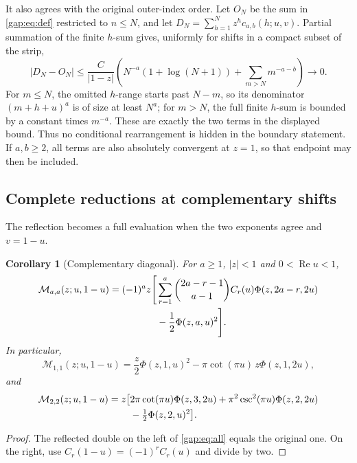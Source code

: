 \documentclass[11pt,letterpaper]{article}
\numberwithin{equation}{section}
\theoremstyle{plain}
\newtheorem{corollary}[theorem]{Corollary}
\theoremstyle{definition}
\theoremstyle{remark}
\begin{document}
It also agrees with the original outer-index order. Let $O_N$ be the
sum in \eqref{gap:eq:def} restricted to $n\leq N$, and let
$D_N=\sum_{h=1}^Nz^hc_{a,b}(h;u,v)$. Partial summation of the finite
$h$-sum gives, uniformly for shifts in a compact subset of the strip,
\[
 |D_N-O_N|\leq\frac{C}{|1-z|}
 \left(N^{-a}(1+\log(N+1))+\sum_{m>N}m^{-a-b}\right)
 \longrightarrow0.
\]
For $m\leq N$, the omitted $h$-range starts past $N-m$, so its
denominator $(m+h+u)^a$ is of size at least $N^a$; for $m>N$, the
full finite $h$-sum is bounded by a constant times $m^{-a}$.
These are exactly the two terms in the displayed bound. Thus no
conditional rearrangement is hidden in the boundary statement.
If $a,b\geq2$,
all terms are also absolutely convergent at $z=1$, so that endpoint
may then be included.

\subsection{Complete reductions at complementary shifts}

The reflection becomes a full evaluation when the two exponents
agree and $v=1-u$.

\begin{corollary}[Complementary diagonal]\label{gap:cor:diagonal}
For $a\geq1$, $|z|<1$ and $0<\operatorname{Re}u<1$,
\begin{align}
 \mathcal M_{a,a}(z;u,1-u)
 =(-1)^a z\Bigg[
 &\sum_{r=1}^{a}\binom{2a-r-1}{a-1}
        C_r(u)\Phi(z,2a-r,2u)\notag\\
 &-\frac12\Phi(z,a,u)^2\Bigg].
 \label{gap:eq:diagonal}
\end{align}
In particular,
\begin{equation}\label{gap:eq:diagonal11}
 \mathcal M_{1,1}(z;u,1-u)
 =\frac z2\Phi(z,1,u)^2
   -\pi\cot(\pi u)\,z\Phi(z,1,2u),
\end{equation}
and
\begin{align}
 \mathcal M_{2,2}(z;u,1-u)
 =z\bigl[&2\pi\cot(\pi u)\Phi(z,3,2u)
          +\pi^2\csc^2(\pi u)\Phi(z,2,2u)\notag\\
          &-\tfrac12\Phi(z,2,u)^2\bigr].
 \label{gap:eq:diagonal22}
\end{align}
\end{corollary}
\begin{proof}
The reflected double on the left of \eqref{gap:eq:all} equals the
original one. On the right, use $C_r(1-u)=(-1)^rC_r(u)$ and divide
by two.
\end{proof}
\end{document}
